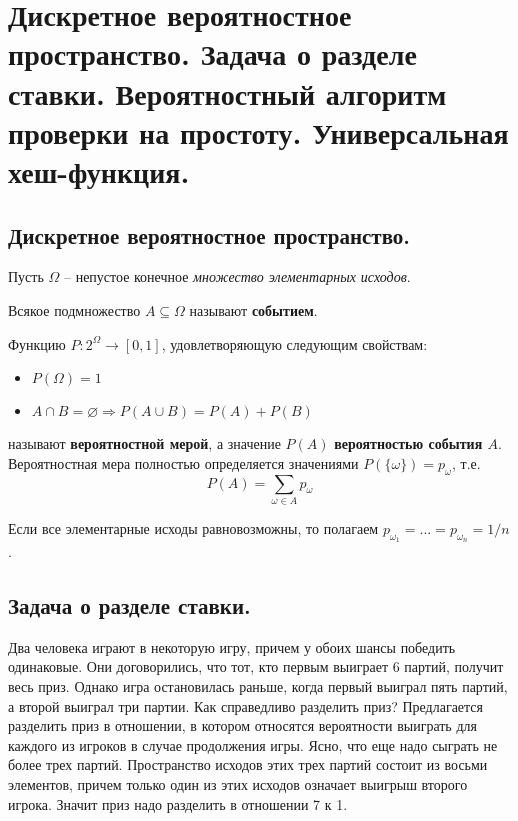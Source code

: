 \section{Дискретное вероятностное пространство. Задача о разделе ставки. Вероятностный алгоритм проверки на простоту. Универсальная хеш-функция.}

\subsection{Дискретное вероятностное пространство.}
Пусть $\Omega$ -- непустое конечное \textit{множество элементарных исходов}.
\begin{definition}
    Всякое подмножество $A \subseteq \Omega$ называют \textbf{событием}.
\end{definition}
\begin{definition}
    Функцию $P : 2^{\Omega} \to [0, 1]$, удовлетворяющую следующим свойствам:
    \begin{itemize}
        \item $P(\Omega) = 1$
        \item $A \cap B = \varnothing \Rightarrow P(A \cup B) = P(A) + P(B)$
    \end{itemize}
    называют \textbf{вероятностной мерой}, а значение $P(A)$ \textbf{вероятностью события $A$}.
    Вероятностная мера полностью определяется значениями $P(\{\omega\}) = p_{\omega}$, т.е.
    \[
        P(A) = \sum_{\omega \in A} p_{\omega}
    \]
\end{definition}
Если все элементарные исходы равновозможны, то полагаем $p_{\omega_1} = ... = p_{\omega_n} = 1/n$.

\subsection{Задача о разделе ставки.}
Два человека играют в некоторую игру, причем у обоих шансы победить одинаковые. Они договорились, что тот, кто первым выиграет 6 партий, получит весь приз. Однако игра остановилась раньше, когда первый выиграл пять партий, а второй выиграл три партии. Как справедливо разделить приз?
\newline
Предлагается разделить приз в отношении, в котором относятся вероятности выиграть для каждого из игроков в случае продолжения игры. Ясно, что еще надо сыграть не более трех партий. Пространство исходов этих трех партий состоит из восьми элементов, причем только один из этих исходов означает выигрыш второго игрока. Значит приз надо разделить в отношении 7 к 1.

